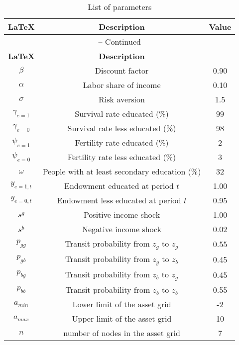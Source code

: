 \begin{center}
\begin{longtable}{ccc}
\caption{List of parameters}\\%
\hline%
\multicolumn{1}{c}{\textbf{\LaTeX}} &
\multicolumn{1}{c}{\textbf{Description}} &
\multicolumn{1}{c}{\textbf{Value}}\\%
\hline\hline%
\endfirsthead
\multicolumn{3}{c}{{\tablename} \thetable{} -- Continued}\\%
\hline%
\multicolumn{1}{c}{\textbf{\LaTeX}} &
\multicolumn{1}{c}{\textbf{Description}}\\%
\hline\hline%
\endhead
${\beta}$ & Discount factor & 0.90\\
${\alpha}$ & Labor share of income & 0.10\\
${\sigma}$ & Risk aversion & 1.5 \\
${\gamma_{e=1}}$ & Survival rate educated (\%) & 99\\
${\gamma_{e=0}}$ & Survival rate less educated (\%) & 98\\
${\psi_{e=1}}$ & Fertility rate educated (\%) & 2\\
${\psi_{e=0}}$ & Fertility rate less educated (\%) & 3\\
${\omega}$ & People with at least secondary education (\%) & 32\\
${y_{e=1,t}}$ & Endowment educated at period $t$ & 1.00\\
${y_{e=0,t}}$ & Endowment less educated at period $t$ & 0.95\\
$s^{g}$ & Positive income shock & 1.00\\
$s^{b}$ & Negative income shock & 0.02\\
$p_{gg}$ & Transit probability from $z_{g}$ to $z_{g}$ & 0.55\\
$p_{gb}$ & Transit probability from $z_{g}$ to $z_{b}$ & 0.45\\
$p_{bg}$ & Transit probability from $z_{b}$ to $z_{g}$ & 0.45\\
$p_{bb}$ & Transit probability from $z_{b}$ to $z_{b}$ & 0.55\\
$a_{min}$ & Lower limit of the asset grid & -2 \\
$a_{max}$ & Upper limit of the asset grid & 10\\
$n$ & number of nodes in the asset grid& 7\\

\hline%
\end{longtable}
\end{center}